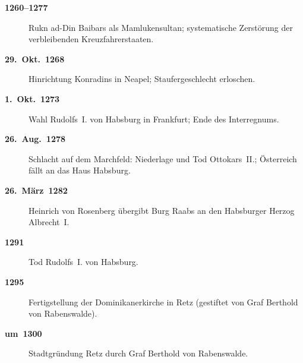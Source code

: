 \begin{description}
  \item[\textbf{1260--1277}] Rukn ad-Din Baibars als Mamlukensultan; systematische Zerstörung der verbleibenden Kreuzfahrerstaaten.
  \item[\textbf{29.~Okt.~1268}] Hinrichtung Konradins in Neapel; Staufergeschlecht erloschen.
  \item[\textbf{1.~Okt.~1273}] Wahl Rudolfs~I. von Habsburg in Frankfurt; Ende des Interregnums.
  \item[\textbf{26.~Aug.~1278}] Schlacht auf dem Marchfeld: Niederlage und Tod Ottokars~II.; Österreich fällt an das Haus Habsburg.
  \item[\textbf{26.~März~1282}] Heinrich von Rosenberg übergibt Burg Raabs an den Habsburger Herzog Albrecht~I.
  \item[\textbf{1291}] Tod Rudolfs~I. von Habsburg.
  \item[\textbf{1295}] Fertigstellung der Dominikanerkirche in Retz (gestiftet von Graf Berthold von Rabenswalde).
  \item[\textbf{um~1300}] Stadtgründung Retz durch Graf Berthold von Rabenswalde.
\end{description}
